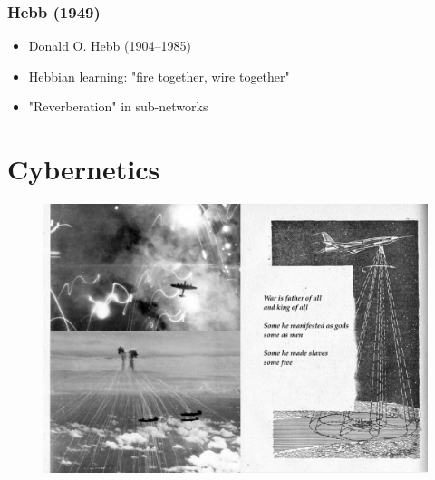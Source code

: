 \documentclass{beamer}
\begin{document}
\begin{frame}
\frametitle{Hebb (1949)}
\begin{itemize}
    \item Donald O. Hebb (1904--1985)
    \item Hebbian learning: "fire together, wire together"
    \item "Reverberation" in sub-networks
\end{itemize}
\begin{figure}[t]
    \centering
    \caption{\cite{hebbOrganizationBehaviorNeuropsychological2002}}
\end{figure}

\end{frame}

\section{Cybernetics}

\begin{frame}
\begin{figure}[t]
    \centerline{\includegraphics[width=1.2\textwidth]{figure/war_is_the_father_of_all.png}}
\end{figure}
\end{frame}
\end{document}

